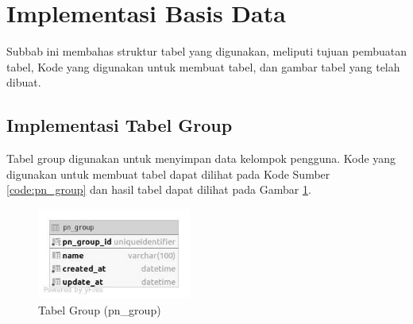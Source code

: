 \section{Implementasi Basis Data}
\par Subbab ini membahas struktur tabel yang digunakan, meliputi tujuan pembuatan tabel, Kode yang digunakan untuk membuat tabel, dan gambar tabel yang telah dibuat.

%

\subsection{Implementasi Tabel Group}
\par Tabel group digunakan untuk menyimpan data kelompok pengguna. Kode yang digunakan untuk membuat tabel dapat dilihat pada Kode Sumber \ref{code:pn_group} dan hasil tabel dapat dilihat pada Gambar \ref{tabel_pn_group}.

\begin{figure}[H]
    \centering\includegraphics[width=0.45\textwidth]{bab4/figures/tabel_pn_group.jpg}
    \caption{Tabel Group (pn\_group)}
    \label{tabel_pn_group}
\end{figure}

